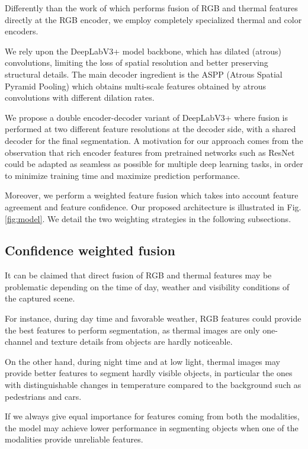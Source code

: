 \documentclass[10pt,twocolumn,letterpaper]{article}
\begin{document}
Differently than the work of \cite{Sun2019} which performs fusion of RGB and thermal features directly at the RGB encoder, we employ completely specialized thermal and color encoders.

We rely upon the DeepLabV3+ \cite{Chen_2018_ECCV} model backbone, which has dilated (atrous) convolutions, limiting the loss of spatial resolution and better preserving structural details. The main decoder ingredient is the ASPP (Atrous Spatial Pyramid Pooling) which obtains multi-scale features obtained by atrous convolutions with different dilation rates. 

We propose a double encoder-decoder variant of DeepLabV3+ where fusion is performed at two different feature resolutions at the decoder side, with a shared decoder for the final segmentation. A motivation for our approach comes from the observation that rich encoder features from pretrained networks such as ResNet \cite{DBLP:conf/cvpr/HeZRS16} could be adapted as seamless as possible for multiple deep learning tasks, in order to minimize training time and maximize prediction performance. 

Moreover, we perform a weighted feature fusion which takes into account feature agreement and feature confidence. Our proposed architecture is illustrated in Fig. \ref{fig:model}. We detail the two weighting strategies in the following subsections.

\subsection{Confidence weighted fusion}

It can be claimed that direct fusion of RGB and thermal features may be problematic depending on the time of day, weather and visibility conditions of the captured scene. 

For instance, during day time and favorable weather, RGB features could provide the best features to perform segmentation, as thermal images are only one-channel and texture details from objects are hardly noticeable.

On the other hand, during night time and at low light, thermal images may provide better features to segment hardly visible objects, in particular the ones with distinguishable changes in temperature compared to the background such as pedestrians and cars.

If we always give equal importance for features coming from both the modalities, the model may achieve lower performance in segmenting objects when one of the modalities provide unreliable features.
\end{document}
